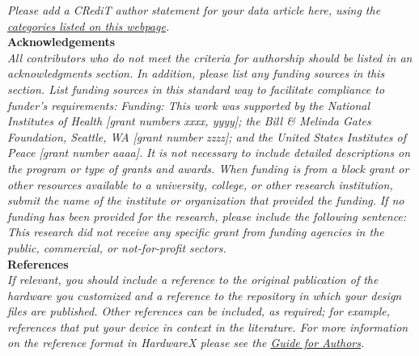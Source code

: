 \documentclass[11pt, letterpaper]{article}
\begin{document}
\noindent
{\it Please add a CRediT author statement for your data article here, using the \href{https://www.elsevier.com/authors/journal-authors/policies-and-ethics/credit-author-statement}{categories listed on this webpage}.}\\


\noindent
\textbf{Acknowledgements}\\
\noindent
\textit{All contributors who do not meet the criteria for authorship should be listed in an acknowledgments section.} 
\vskip 0.2cm
\noindent
\textit{In addition, please list any funding sources in this section. List funding sources in this standard way to facilitate compliance to funder's requirements:}
\vskip 0.2cm
\noindent
\textit{Funding: This work was supported by the National Institutes of Health [grant numbers xxxx, yyyy]; the Bill \& Melinda Gates Foundation, Seattle, WA [grant number zzzz]; and the United States Institutes of Peace [grant number aaaa].}
\vskip 0.2cm
\noindent
\textit{It is not necessary to include detailed descriptions on the program or type of grants and awards. When funding is from a block grant or other resources available to a university, college, or other research institution, submit the name of the institute or organization that provided the funding.}
\vskip 0.2cm
\noindent
\textit{If no funding has been provided for the research, please include the following sentence:}
\vskip 0.2cm
\noindent
\textit{This research did not receive any specific grant from funding agencies in the public, commercial, or not-for-profit sectors.
}\\


\noindent
\textbf{References}\\
\noindent 
\textit{If relevant, you should include a reference to the original publication of the hardware you customized and a reference to the repository in which your design files are published.  Other references can be included, as required; for example, references that put your device in context in the literature. For more information on the reference format in HardwareX please see the \href{https://www.elsevier.com/journals/hardwarex/2468-0672/guide-for-authors}{\underline{Guide for Authors}}.}
\end{document}
